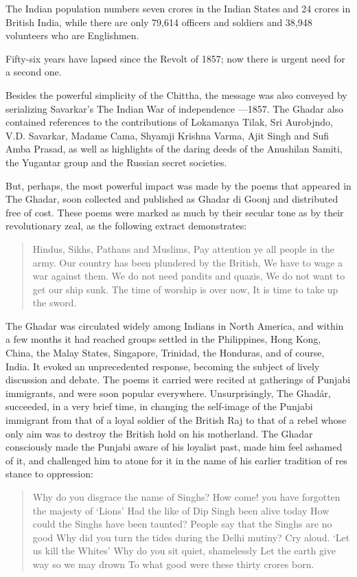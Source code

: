 The Indian population numbers seven crores in the Indian States and 24 crores in British India, while there are only 79,614 officers and soldiers and 38,948 volunteers who are Englishmen.

Fifty-six years have lapsed since the Revolt of 1857; now there is urgent need for a second one.

Besides the powerful simplicity of the Chittha, the message was also conveyed by serializing Savarkar's The Indian War of independence —1857. The Ghadar also contained references to the contributions of Lokamanya Tilak, Sri Aurobjndo, V.D. Savarkar, Madame Cama, Shyamji Krishna Varma, Ajit Singh and Sufi Amba Prasad, as well as highlights of the daring deeds of the Anushilan Samiti, the Yugantar group and the Russian secret societies.

But, perhaps, the most powerful impact was made by the poems that appeared in The Ghadar, soon collected and published as Ghadar di Goonj and distributed free of cost. These poems were marked as much by their secular tone as by their revolutionary zeal, as the following extract demonstrates:

\begin{verse}
	Hindus, Sikhs, Pathans and Muslims,
	Pay attention ye all people in the army.
	Our country has been plundered by the British,
	We have to wage a war against them.
	We do not need pandits and quazis,
	We do not want to get our ship sunk.
	The time of worship is over now,
	It is time to take up the sword.
\end{verse}

The Ghadar was circulated widely among Indians in North America, and within a few months it had reached groups settled in the Philippines, Hong Kong, China, the Malay States, Singapore, Trinidad, the Honduras, and of course, India. It evoked an unprecedented response, becoming the subject of lively discussion and debate. The poems it carried were recited at gatherings of Punjabi immigrants, and were soon popular everywhere. Unsurprisingly, The Ghadár, succeeded, in a very brief time, in changing the self-image of the Punjabi immigrant from that of a loyal soldier of the British Raj to that of a rebel whose only aim was to destroy the British hold on his motherland. The Ghadar consciously made the Punjabi aware of his loyalist past, made him feel ashamed of it, and challenged him to atone for it in the name of his earlier tradition of res stance to oppression:

\begin{verse}
	Why do you disgrace the name of Singhs?
	How come! you have forgotten the majesty of `Lions'
	Had the like of Dip Singh been alive today
	How could the Singhs have been taunted?
	People say that the Singhs are no good
	Why did you turn the tides during the Delhi mutiny?
	Cry aloud. `Let us kill the Whites'
	Why do you sit quiet, shamelessly
	Let the earth give way so we may drown
	To what good were these thirty crores born.
\end{verse}

